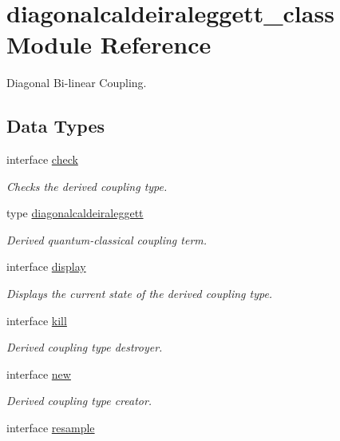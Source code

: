 \hypertarget{classdiagonalcaldeiraleggett__class}{\section{diagonalcaldeiraleggett\+\_\+class Module Reference}
\label{classdiagonalcaldeiraleggett__class}
}


Diagonal Bi-\/linear Coupling.  


\subsection*{Data Types}
\begin{DoxyCompactItemize}
\item 
interface \hyperlink{interfacediagonalcaldeiraleggett__class_1_1check}{check}
\begin{DoxyCompactList}\small\item\em Checks the derived coupling type. \end{DoxyCompactList}\item 
type \hyperlink{structdiagonalcaldeiraleggett__class_1_1diagonalcaldeiraleggett}{diagonalcaldeiraleggett}
\begin{DoxyCompactList}\small\item\em Derived quantum-\/classical coupling term. \end{DoxyCompactList}\item 
interface \hyperlink{interfacediagonalcaldeiraleggett__class_1_1display}{display}
\begin{DoxyCompactList}\small\item\em Displays the current state of the derived coupling type. \end{DoxyCompactList}\item 
interface \hyperlink{interfacediagonalcaldeiraleggett__class_1_1kill}{kill}
\begin{DoxyCompactList}\small\item\em Derived coupling type destroyer. \end{DoxyCompactList}\item 
interface \hyperlink{interfacediagonalcaldeiraleggett__class_1_1new}{new}
\begin{DoxyCompactList}\small\item\em Derived coupling type creator. \end{DoxyCompactList}\item 
interface \hyperlink{interfacediagonalcaldeiraleggett__class_1_1resample}{resample}

\end{DoxyCompactItemize}
